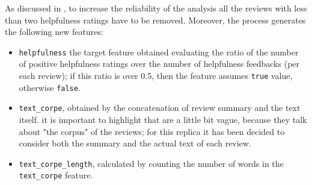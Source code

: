 \documentclass[a4paper]{article}
\begin{document}
		 	As discussed in \cite{article:muller}, to increase the reliability of the analysis all the reviews with less than two helpfulness ratings have to be removed. Moreover, the process generates the following new features:
		 	\begin{itemize}
		 		\item \verb*|helpfulness| the target feature obtained evaluating the ratio of the number of positive helpfulness ratings over the number of helpfulness feedbacks (per each review); if this ratio is over 0.5, then the feature assumes \verb*|true| value, otherwise \verb*|false|.
		 		\item \verb*|text_corpe|, obtained by the concatenation of review summary and the text itself. it is important to highlight that \citeauthor{article:muller} are a little bit vague, because they talk about "the corpus" of the reviews; for this replica it has been decided to consider both the summary and the actual text of each review.
		 		\item \verb*|text_corpe_length|, calculated by counting the number of words in the \verb*|text_corpe| feature. 
		 	\end{itemize} 
	 	
\end{document}
